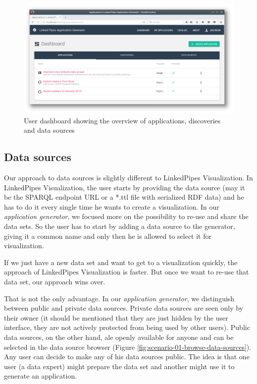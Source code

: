 \begin{figure}
	\centering
	\includegraphics[width=145mm]{img/05_dashboard}
	\caption{User dashboard showing the overview of applications, discoveries and data sources}
    \label{fig:dashboard}
\end{figure}

\subsection{Data sources}

Our  approach to data sources is slightly different to LinkedPipes Visualization. In LinkedPipes Visualization, the user starts by providing the data source (may it be the SPARQL endpoint URL or a *.ttl file with serialized RDF data) and he has to do it every single time he wants to create a visualization. In our \emph{application generator}, we focused more on the possibility to re-use and share the data sets. So the user has to start by adding a data source to the generator, giving it a common name and only then he is allowed to select it for visualization. 

If we just have a new data set and want to get to a visualization quickly, the approach of LinkedPipes Visualization is faster. But once we want to re-use that data set, our approach wins over. 

That is not the only advantage. In our \emph{application generator}, we distinguish between public and private data sources. Private data sources are seen only by their owner (it should be mentioned that they are just hidden by the user interface, they are not actively protected from being used by other users). Public data sources, on the other hand, ale openly available for anyone and can be selected in the data source browser (Figure \ref{fig:scenario-01-browse-data-sources}). Any user can decide to make any of his data sources public. The idea is that one user (a data expert) might prepare the data set and another might use it to generate an application.

